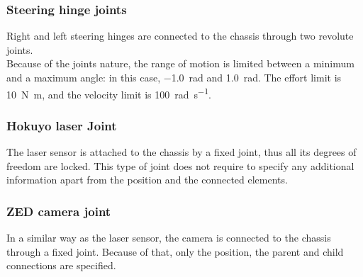 \subsubsection{Steering hinge joints}
Right and left steering hinges are connected to the chassis through two revolute joints. \\
Because of the joints nature, the range of motion is limited between a minimum and a maximum angle:
in this case, \SI{-1.0}{\radian} and \SI{1.0}{\radian}.
The effort limit is \SI[inter-unit-product =\ensuremath{\cdot}]{10}{\newton\metre}, and the velocity limit is 
\SI[per-mode = symbol]{100}{\radian \per \second}.

\subsubsection{Hokuyo laser Joint}
The laser sensor is attached to the chassis by a fixed joint, thus all its degrees of freedom are locked. This type 
of joint does not require to specify any additional information apart from the position and the connected elements.

\subsubsection{ZED camera joint}
In a similar way as the laser sensor, the camera is connected to the chassis through a fixed joint.
Because of that, only the position, the parent and child connections are specified.

